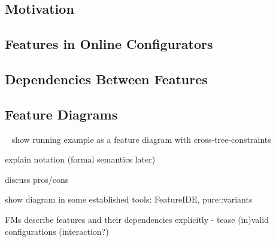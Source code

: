 
\subsection{Motivation}


\subsection{Features in Online Configurators}

\subsection{Dependencies Between Features}








\subsection{Feature Diagrams} %

\begin{frame}{~}
show running example as a feature diagram with cross-tree-constraints

explain notation (formal semantics later)

discuss pros/cons

show diagram in some established tools: FeatureIDE, pure::variants

FMs describe features and their dependencies explicitly - tease (in)valid configurations (interaction?)
\end{frame}

